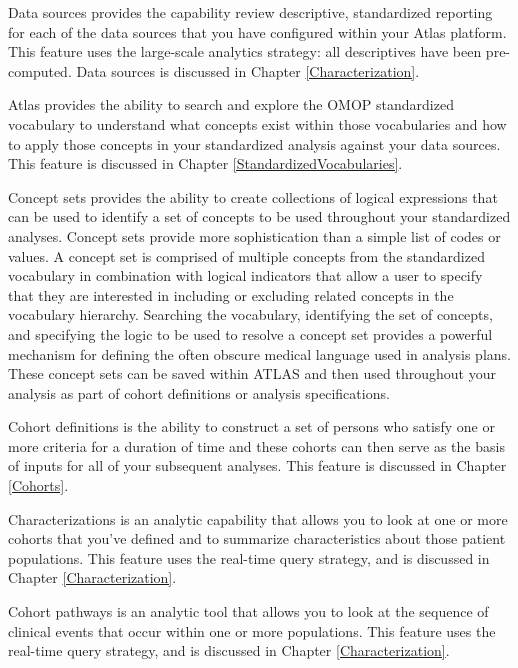 \documentclass[11pt]{book}
\providecommand{\tightlist}{%
  \setlength{\itemsep}{0pt}\setlength{\parskip}{0pt}}
\theoremstyle{definition}
\theoremstyle{definition}
\theoremstyle{definition}
\theoremstyle{remark}
\begin{document}
\begin{description}
\tightlist
\item[Data Sources]
Data sources provides the capability review descriptive, standardized reporting for each of the data sources that you have configured within your Atlas platform. This feature uses the large-scale analytics strategy: all descriptives have been pre-computed. Data sources is discussed in Chapter \ref{Characterization}.
\item[Vocabulary Search]
Atlas provides the ability to search and explore the OMOP standardized vocabulary to understand what concepts exist within those vocabularies and how to apply those concepts in your standardized analysis against your data sources. This feature is discussed in Chapter \ref{StandardizedVocabularies}.
\item[Concept Sets]
Concept sets provides the ability to create collections of logical expressions that can be used to identify a set of concepts to be used throughout your standardized analyses. Concept sets provide more sophistication than a simple list of codes or values. A concept set is comprised of multiple concepts from the standardized vocabulary in combination with logical indicators that allow a user to specify that they are interested in including or excluding related concepts in the vocabulary hierarchy. Searching the vocabulary, identifying the set of concepts, and specifying the logic to be used to resolve a concept set provides a powerful mechanism for defining the often obscure medical language used in analysis plans. These concept sets can be saved within ATLAS and then used throughout your analysis as part of cohort definitions or analysis specifications.
\item[Cohort Definitions]
Cohort definitions is the ability to construct a set of persons who satisfy one or more criteria for a duration of time and these cohorts can then serve as the basis of inputs for all of your subsequent analyses. This feature is discussed in Chapter \ref{Cohorts}.
\item[Characterizations]
Characterizations is an analytic capability that allows you to look at one or more cohorts that you've defined and to summarize characteristics about those patient populations. This feature uses the real-time query strategy, and is discussed in Chapter \ref{Characterization}.
\item[Cohort Pathways]
Cohort pathways is an analytic tool that allows you to look at the sequence of clinical events that occur within one or more populations. This feature uses the real-time query strategy, and is discussed in Chapter \ref{Characterization}.

\end{description}
\end{document}

